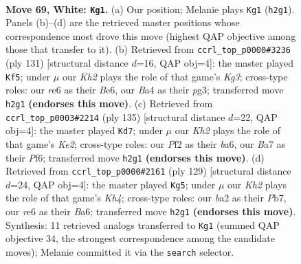 \documentclass[11pt]{article}
\begin{document}
\clearpage

\begin{figure}[p]\centering
\begin{subfigure}{0.46\textwidth}\centering
\resizebox{\linewidth}{!}{%
\newchessgame
\chessboard[
  setfen={2R5/B5k1/4r3/8/B3p2p/5p1P/b4P1K/8 w - - 48 69},
  showmover=false,
  pgfstyle=straightmove, color=movearrow, markmove={h2-g1}
]}
\caption{}
\end{subfigure}\hfill
\begin{subfigure}{0.46\textwidth}\centering
\resizebox{\linewidth}{!}{%
\newchessgame
\chessboard[
  setfen={8/2B5/2p1b1k1/7p/2pP3P/6P1/3K4/8 b - - 14 66},
  showmover=false,
  pgfstyle=straightmove, color=movearrow, markmove={g6-f5}
]}
\caption{}
\end{subfigure}
\\[4pt]
\begin{subfigure}{0.46\textwidth}\centering
\resizebox{\linewidth}{!}{%
\newchessgame
\chessboard[
  setfen={8/4k3/B2p1p2/p4P1K/4P3/1P6/P7/4b3 b - - 30 68},
  showmover=false,
  pgfstyle=straightmove, color=movearrow, markmove={e7-d7}
]}
\caption{}
\end{subfigure}\hfill
\begin{subfigure}{0.46\textwidth}\centering
\resizebox{\linewidth}{!}{%
\newchessgame
\chessboard[
  setfen={8/1p6/b7/4B2k/1P3p1p/5P1P/6P1/6K1 b - - 13 65},
  showmover=false,
  pgfstyle=straightmove, color=movearrow, markmove={h5-g5}
]}
\caption{}
\end{subfigure}
\caption{\textbf{Move 69, White: \texttt{Kg1}.} (a) Our position; Melanie plays \texttt{Kg1} (\texttt{h2g1}). Panels (b)--(d) are the retrieved master positions whose correspondence most drove this move (highest QAP objective among those that transfer to it). (b) Retrieved from \texttt{ccrl\_top\_p0000\#3236} (ply 131) [structural distance $d$=16, QAP obj=4]: the master played \texttt{Kf5}; under $\mu$ our \emph{Kh2} plays the role of that game's \emph{Kg3}; cross-type roles: our \emph{r}e6 as their \emph{B}e6, our \emph{B}a4 as their \emph{p}g3; transferred move \texttt{h2g1} \textbf{(endorses this move)}. (c) Retrieved from \texttt{ccrl\_top\_p0003\#2214} (ply 135) [structural distance $d$=22, QAP obj=4]: the master played \texttt{Kd7}; under $\mu$ our \emph{Kh2} plays the role of that game's \emph{Ke2}; cross-type roles: our \emph{P}f2 as their \emph{b}a6, our \emph{B}a7 as their \emph{P}f6; transferred move \texttt{h2g1} \textbf{(endorses this move)}. (d) Retrieved from \texttt{ccrl\_top\_p0000\#2161} (ply 129) [structural distance $d$=24, QAP obj=4]: the master played \texttt{Kg5}; under $\mu$ our \emph{Kh2} plays the role of that game's \emph{Kh4}; cross-type roles: our \emph{b}a2 as their \emph{P}b7, our \emph{r}e6 as their \emph{B}a6; transferred move \texttt{h2g1} \textbf{(endorses this move)}. Synthesis: 11 retrieved analogs transferred to \texttt{Kg1} (summed QAP objective 34, the strongest correspondence among the candidate moves); Melanie committed it via the \texttt{search} selector.}
\label{fig:thought-m136}
\end{figure}
\end{document}
